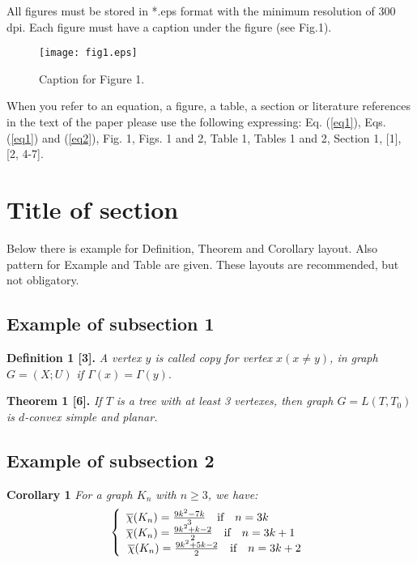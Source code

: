 \documentclass[11pt,twoside,a5paper]{article}
\begin{document}
All figures must be stored in *.eps format with the minimum 
resolution of 300 dpi. Each figure must have a caption under the figure (see 
Fig.1).

\begin{figure}[htbp]
\centerline{\texttt{[image: fig1.eps]}}
\label{fig1}
\caption{Caption for Figure 1.}
\end{figure}

When you refer to an equation, a figure, a table, a section or literature 
references in the text of the paper please use the following expressing: Eq. 
(\ref{eq1}), Eqs. (\ref{eq1}) and (\ref{eq2}), Fig. 1, Figs. 1 and 2, Table 1, Tables 1 and 2, Section 1, [1], [2, 4-7].


\section{Title of section}

Below there is example for Definition, Theorem and Corollary layout. Also 
pattern for Example and Table are given. These layouts are recommended, 
but not obligatory.


\subsection{Example of subsection 1}

\textbf{Definition 1 [3].} \textit{A vertex $y$ is called copy for vertex $x(x\ne y)$, in graph $G = (X;U)$ if $\Gamma (x)=\Gamma (y)$}.

\medskip
\noindent \textbf{Theorem 1 [6]. }\textit{If $T$ is a tree with at least 3 vertexes, then graph $G= L(T, T_{0})$ is $d$-convex simple and planar.}


\subsection{Example of subsection 2}

\textbf{Corollary 1} \textit{For a graph $K_n$ with $n\ge 3$, we have:}
\[
\left\{ {{\begin{array}{*{20}c}
 {\overline \chi (K_n )=\frac{9k^2-7k}{3}\quad \mbox{if}\quad n=3k} \quad\quad\quad\\
 {\overline \chi (K_n )=\frac{9k^2+k-2}{2}\quad \mbox{if}\quad n=3k+1} \ \  \\
 {\overline \chi (K_n )=\frac{9k^2+5k-2}{2}\quad \mbox{if}\quad n=3k+2} \\
\end{array} }} \right.
\]
\end{document}
